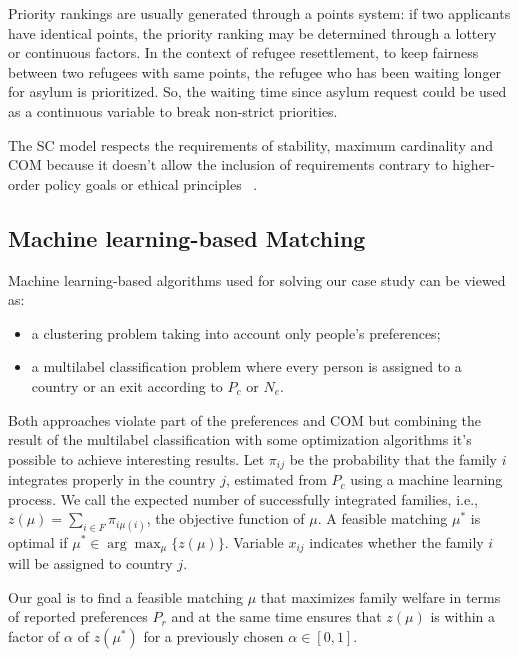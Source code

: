 Priority rankings are usually generated through a points system: if two applicants have identical points, the priority ranking may be determined through a lottery or continuous factors. In the context of refugee resettlement, to keep fairness between two refugees with same points, the refugee who has been waiting longer for asylum is prioritized. So, the waiting time since asylum request could be used as a continuous variable to break non-strict priorities.

The SC model respects the requirements of stability, maximum cardinality and COM because it doesn't allow the inclusion of requirements contrary to higher-order policy goals or ethical principles ~\cite{basshuysen}.


\subsection{Machine learning-based Matching}\label{machine-learning-based-matching}%

Machine learning-based algorithms used for solving our case study can be viewed as:

\begin{itemize}
    \item a clustering problem taking into account only people's preferences;
    \item a multilabel classification problem where every person is assigned to a country or an exit according to \(P_c\) or \(N_e\).
\end{itemize}
Both approaches violate part of the preferences and COM but combining the result of the multilabel classification with some optimization algorithms it's possible to achieve interesting results. Let \(\pi_{ij}\) be the probability that the family \(i\) integrates properly in the country \(j\), estimated from \(P_c\) using a machine learning process. We call the expected number of successfully integrated families, i.e., \(z (\mu) = \sum_{i \in F} \pi_{i \mu (i)}\), the objective function of \(\mu\). A feasible matching \(\mu^*\) is optimal if \(\mu^* \in \arg\max_{\mu} \{z (\mu)\}\). Variable \(x_{ij}\) indicates whether the family \(i\) will be assigned to country \(j\).

Our goal is to find a feasible matching \(\mu\) that maximizes family welfare in terms of reported preferences \(P_r\) and at the same time ensures that \(z (\mu)\) is within a factor of \(\alpha\) of \(z \left( \mu^* \right)\) for a previously chosen \(\alpha \in [0,1]\).

